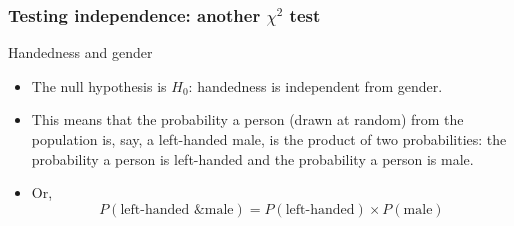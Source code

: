 \documentclass[handout]{beamer}
\begin{document}
   \begin{frame} \frametitle{Testing independence: another $\chi^2$ test}

   \begin{block}
     {Handedness and gender}
     \begin{itemize}
     \item The null hypothesis is {\color{blue} $H_0$: handedness is independent
     from gender}.
     \item This means that the probability a person (drawn at random)
     from the population is, say, a left-handed male, is the
     product of two probabilities: the probability a person
     is left-handed and the probability a person is male.
     \item Or,
     $$
     P(\text{left-handed \& male}) = P(\text{left-handed}) \times P(\text{male})
     $$
     \end{itemize}
   \end{block}
   \end{frame}

\end{document}
